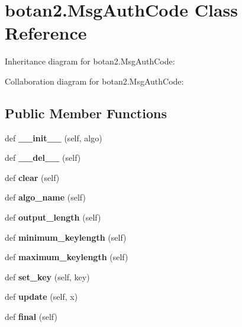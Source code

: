 \hypertarget{classbotan2_1_1_msg_auth_code}{}\section{botan2.\+Msg\+Auth\+Code Class Reference}
\label{classbotan2_1_1_msg_auth_code}


Inheritance diagram for botan2.\+Msg\+Auth\+Code\+:


Collaboration diagram for botan2.\+Msg\+Auth\+Code\+:
\subsection*{Public Member Functions}
\begin{DoxyCompactItemize}
\item 
\mbox{\label{classbotan2_1_1_msg_auth_code_a63180cb200440bb412bfd3c0dd7ed52c}} 
def {\bfseries \+\_\+\+\_\+init\+\_\+\+\_\+} (self, algo)
\item 
\mbox{\label{classbotan2_1_1_msg_auth_code_a026a0efcd3b1676416b59a7a55ef6e88}} 
def {\bfseries \+\_\+\+\_\+del\+\_\+\+\_\+} (self)
\item 
\mbox{\label{classbotan2_1_1_msg_auth_code_a1673b61748126ba0929e9fd64063680d}} 
def {\bfseries clear} (self)
\item 
\mbox{\label{classbotan2_1_1_msg_auth_code_a6af3ca59c46fcc3c0a32feb3397378de}} 
def {\bfseries algo\+\_\+name} (self)
\item 
\mbox{\label{classbotan2_1_1_msg_auth_code_aa9accbb24575711cfedb1dab213d9cc1}} 
def {\bfseries output\+\_\+length} (self)
\item 
\mbox{\label{classbotan2_1_1_msg_auth_code_aeb7410db0a14266ed387c7b29b5d391c}} 
def {\bfseries minimum\+\_\+keylength} (self)
\item 
\mbox{\label{classbotan2_1_1_msg_auth_code_a82a831e14ecd682842a0c45ee5a7139c}} 
def {\bfseries maximum\+\_\+keylength} (self)
\item 
\mbox{\label{classbotan2_1_1_msg_auth_code_a83570b285641b0d6c85df9e2b185ef69}} 
def {\bfseries set\+\_\+key} (self, key)
\item 
\mbox{\label{classbotan2_1_1_msg_auth_code_a4523da73b71f774b9c544be239385ec2}} 
def {\bfseries update} (self, x)
\item 
\mbox{\label{classbotan2_1_1_msg_auth_code_a8d4947f6febbf66e26db2bd0a681a880}} 
def {\bfseries final} (self)
\end{DoxyCompactItemize}


